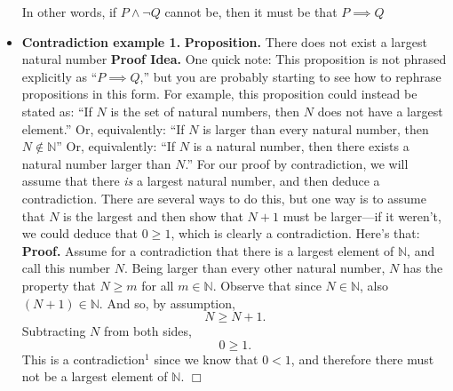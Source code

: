 \documentclass{report}
\begin{document}
\begin{itemize}
            \bigbreak \noindent 
            In other words, if $P \land \neg Q$ cannot be, then it must be that $P \implies Q$
        \item \textbf{Contradiction example 1.} 
            \bigbreak \noindent 
            \textbf{Proposition.} There does not exist a largest natural number
            \bigbreak \noindent 
            \textbf{Proof Idea.} One quick note: This proposition is not phrased explicitly as 
            ``\(P \implies Q\),'' but you are probably starting to see how to rephrase propositions 
            in this form. For example, this proposition could instead be stated as: 
            ``If \(N\) is the set of natural numbers, then \(N\) does not have a largest element.'' 
            Or, equivalently: ``If \(N\) is larger than every natural number, then \(N \notin \mathbb{N}\)'' 
            Or, equivalently: ``If \(N\) is a natural number, then there exists a natural number 
            larger than \(N\).''
            \bigbreak \noindent 
            For our proof by contradiction, we will assume that there \emph{is} a largest natural number, 
            and then deduce a contradiction. There are several ways to do this, but one way is to assume 
            that \(N\) is the largest and then show that \(N + 1\) must be larger—if it weren’t, we could 
            deduce that \(0 \geq 1\), which is clearly a contradiction. Here’s that:
            \bigbreak \noindent 
            \textbf{Proof.} Assume for a contradiction that there is a largest element of \(\mathbb{N}\), and call this number \(N\). Being larger than every other natural number, \(N\) has the property that \(N \geq m\) for all \(m \in \mathbb{N}\).
            \bigbreak \noindent 
            Observe that since \(N \in \mathbb{N}\), also \((N + 1) \in \mathbb{N}\). And so, by assumption,
            \[
                N \geq N + 1.
            \]
            Subtracting \(N\) from both sides,
            \[
                0 \geq 1.
            \]
            This is a contradiction\(^1\) since we know that \(0 < 1\), and therefore there must not be a largest element of \(\mathbb{N}\). \(\Box\)


\end{itemize}
\end{document}
